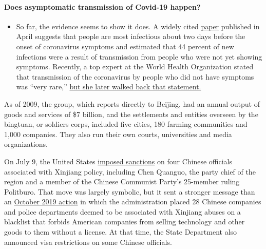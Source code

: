 \begin{itemize}
{  \paragraph{Does asymptomatic transmission of Covid-19
  happen?}\label{does-asymptomatic-transmission-of-covid-19-happen}}

  \begin{itemize}
  \tightlist
  \item
    So far, the evidence seems to show it does. A widely cited
    \href{https://www.nature.com/articles/s41591-020-0869-5}{paper}
    published in April suggests that people are most infectious about
    two days before the onset of coronavirus symptoms and estimated that
    44 percent of new infections were a result of transmission from
    people who were not yet showing symptoms. Recently, a top expert at
    the World Health Organization stated that transmission of the
    coronavirus by people who did not have symptoms was ``very rare,''
    \href{https://www.nytimes.com/2020/06/09/world/coronavirus-updates.html?action=click\&pgtype=Article\&state=default\&region=MAIN_CONTENT_3\&context=storylines_faq\#link-1f302e21}{but
    she later walked back that statement.}
  \end{itemize}
\end{itemize}

As of 2009, the group, which reports directly to Beijing, had an annual
output of goods and services of \$7 billion, and the settlements and
entities overseen by the bingtuan, or soldiers corps, included five
cities, 180 farming communities and 1,000 companies. They also run their
own courts, universities and media organizations.

On July 9, the United States
\href{https://www.nytimes.com/2020/07/09/world/asia/trump-china-sanctions-uighurs.html}{imposed
sanctions} on four Chinese officials associated with Xinjiang policy,
including Chen Quanguo, the party chief of the region and a member of
the Chinese Communist Party's 25-member ruling Politburo. That move was
largely symbolic, but it sent a stronger message than an
\href{https://www.nytimes.com/2019/10/08/business/china-human-rights-technology-xinjiang.html}{October
2019 action} in which the administration placed 28 Chinese companies and
police departments deemed to be associated with Xinjiang abuses on a
blacklist that forbids American companies from selling technology and
other goods to them without a license. At that time, the State
Department also announced visa restrictions on some Chinese officials.

